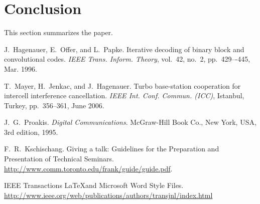 \documentclass[journal, a4paper]{IEEEtran}
\begin{document}
\section{Conclusion}
	This section summarizes the paper.

\begin{thebibliography}{5}

	J.~Hagenauer, E.~Offer, and L.~Papke. Iterative decoding of binary block
	and convolutional codes. {\em IEEE Trans. Inform. Theory},
	vol.~42, no.~2, pp.~429–-445, Mar. 1996.

	T.~Mayer, H.~Jenkac, and J.~Hagenauer. Turbo base-station cooperation for intercell interference cancellation. {\em IEEE Int. Conf. Commun. (ICC)}, Istanbul, Turkey, pp.~356--361, June 2006.

	J.~G.~Proakis. {\em Digital Communications}. McGraw-Hill Book Co.,
	New York, USA, 3rd edition, 1995.

	F.~R.~Kschischang. Giving a talk: Guidelines for the Preparation and Presentation of Technical Seminars.
	\url{http://www.comm.toronto.edu/frank/guide/guide.pdf}.

	IEEE Transactions \LaTeX and Microsoft Word Style Files.
	\url{http://www.ieee.org/web/publications/authors/transjnl/index.html}

\end{thebibliography}

\end{document}
